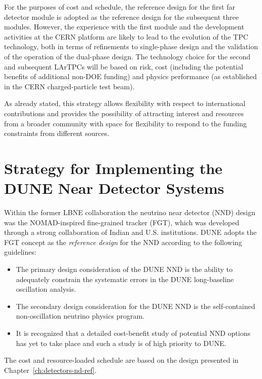 For the purposes of cost and schedule, the reference design for the
first far detector module is adopted as the reference design for the subsequent
three modules. However, the experience with the first 
module and the development activities at the CERN platform are likely
to lead to the evolution of the TPC technology, both in terms of
refinements to single-phase design and the validation of the operation
of the dual-phase design.  The technology choice for the second and
subsequent LArTPCs will be based on risk, cost (including the
potential benefits of additional non-DOE funding) and physics
performance (as established in the CERN charged-particle test beam).

As already stated, this strategy allows flexibility with respect to international
contributions and provides the possibility of attracting interest and
resources from a broader community with space for flexibility to
respond to the funding constraints from different sources. 

\section{Strategy for Implementing the DUNE Near Detector Systems}



Within the former LBNE collaboration the neutrino near
detector (NND) design was the NOMAD-inspired fine-grained tracker
(FGT), which was developed through a strong collaboration of Indian and
U.S. institutions. DUNE adopts the FGT concept as the 
\textit{reference design} for the NND according to the following guidelines:
\begin{itemize}
\item The primary design consideration of the DUNE NND
is the ability to adequately constrain the systematic
  errors in the DUNE long-baseline oscillation analysis.
\item The secondary design consideration for the DUNE NND is the
  self-contained non-oscillation neutrino physics program.
\item It is recognized that a detailed cost-benefit study of potential
  NND options has yet to take place and such a study is of high
  priority to DUNE. 
\end{itemize}
The cost and resource-loaded schedule are based on the design presented in
Chapter~\ref{ch:detectors-nd-ref}.


